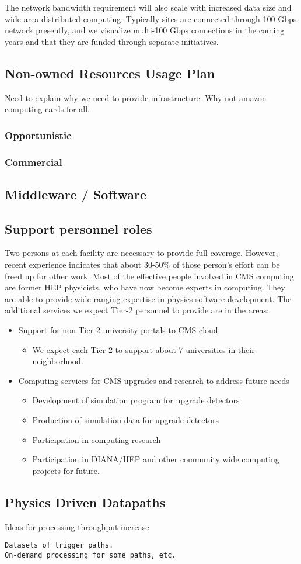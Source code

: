 The network bandwidth requirement will also scale with increased data size 
and wide-area distributed computing.  Typically sites are connected through
100 Gbps network presently, and we visualize multi-100 Gbps connections
in the coming years and that they are funded through separate initiatives.

\subsection{Non-owned Resources Usage Plan}
Need to explain why we need to provide infrastructure.
Why not amazon computing cards for all.
\subsubsection{Opportunistic}
\subsubsection{Commercial}

\subsection{Middleware / Software}

\subsection{Support personnel roles}

Two persons at each facility are necessary to provide full coverage.  However,
recent experience indicates that about 30-50\% of those person's effort can be
freed up for other work. Most of the effective people involved in CMS computing
are former HEP physicists, who have now become experts in computing. They
are able to provide wide-ranging expertise in physics software development.
The additional services we expect Tier-2 personnel to provide are in the areas:
\begin{itemize}
\item Support for non-Tier-2 university portals to CMS cloud
\begin{itemize}
\item We expect each Tier-2 to support about 7 universities in their neighborhood.
\end{itemize}
\item Computing services for CMS upgrades and research to address future needs
\begin{itemize}
\item Development of simulation program for upgrade detectors
\item Production of simulation data for upgrade detectors
\item Participation in computing research
\item Participation in DIANA/HEP and other community wide computing projects for future.
\end{itemize}
\end{itemize} 

\subsection{Physics Driven Datapaths}
Ideas for processing throughput increase
\begin{verbatim}
Datasets of trigger paths.
On-demand processing for some paths, etc.
\end{verbatim}
